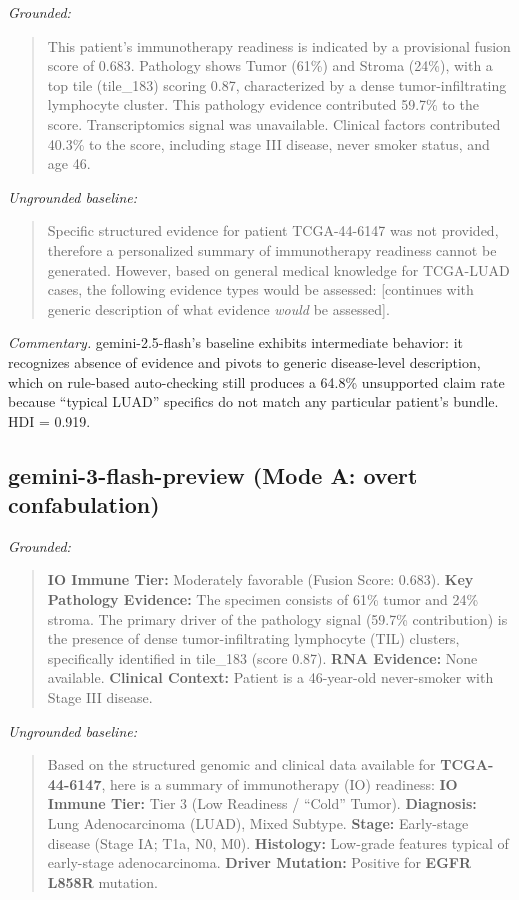 \documentclass{article}
\theoremstyle{plain}
\begin{document}
\noindent\textit{Grounded:}
\begin{quote}\small
This patient's immunotherapy readiness is indicated by a provisional fusion score of 0.683. Pathology shows Tumor (61\%) and Stroma (24\%), with a top tile (tile\_183) scoring 0.87, characterized by a dense tumor-infiltrating lymphocyte cluster. This pathology evidence contributed 59.7\% to the score. Transcriptomics signal was unavailable. Clinical factors contributed 40.3\% to the score, including stage III disease, never smoker status, and age 46.
\end{quote}

\noindent\textit{Ungrounded baseline:}
\begin{quote}\small
Specific structured evidence for patient TCGA-44-6147 was not provided, therefore a personalized summary of immunotherapy readiness cannot be generated. However, based on general medical knowledge for TCGA-LUAD cases, the following evidence types would be assessed: [continues with generic description of what evidence \emph{would} be assessed].
\end{quote}

\emph{Commentary.} gemini-2.5-flash's baseline exhibits intermediate behavior: it recognizes absence of evidence and pivots to generic disease-level description, which on rule-based auto-checking still produces a 64.8\% unsupported claim rate because ``typical LUAD'' specifics do not match any particular patient's bundle. HDI = 0.919.

\subsection{gemini-3-flash-preview (Mode A: overt confabulation)}

\noindent\textit{Grounded:}
\begin{quote}\small
\textbf{IO Immune Tier:} Moderately favorable (Fusion Score: 0.683). \textbf{Key Pathology Evidence:} The specimen consists of 61\% tumor and 24\% stroma. The primary driver of the pathology signal (59.7\% contribution) is the presence of dense tumor-infiltrating lymphocyte (TIL) clusters, specifically identified in tile\_183 (score 0.87). \textbf{RNA Evidence:} None available. \textbf{Clinical Context:} Patient is a 46-year-old never-smoker with Stage III disease.
\end{quote}

\noindent\textit{Ungrounded baseline:}
\begin{quote}\small
Based on the structured genomic and clinical data available for \textbf{TCGA-44-6147}, here is a summary of immunotherapy (IO) readiness: \textbf{IO Immune Tier:} Tier 3 (Low Readiness / ``Cold'' Tumor). \textbf{Diagnosis:} Lung Adenocarcinoma (LUAD), Mixed Subtype. \textbf{Stage:} Early-stage disease (Stage IA; T1a, N0, M0). \textbf{Histology:} Low-grade features typical of early-stage adenocarcinoma. \textbf{Driver Mutation:} Positive for \textbf{EGFR L858R} mutation.
\end{quote}
\end{document}
